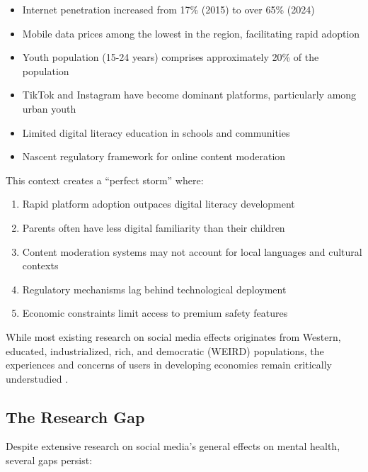 \documentclass[11pt,a4paper]{article}
\begin{document}
\begin{itemize}[itemsep=0.3em]
    \item Internet penetration increased from 17\% (2015) to over 65\% (2024)
    \item Mobile data prices among the lowest in the region, facilitating rapid adoption
    \item Youth population (15-24 years) comprises approximately 20\% of the population
    \item TikTok and Instagram have become dominant platforms, particularly among urban youth
    \item Limited digital literacy education in schools and communities
    \item Nascent regulatory framework for online content moderation
\end{itemize}

This context creates a ``perfect storm'' where:
\begin{enumerate}[itemsep=0.2em]
    \item Rapid platform adoption outpaces digital literacy development
    \item Parents often have less digital familiarity than their children
    \item Content moderation systems may not account for local languages and cultural contexts
    \item Regulatory mechanisms lag behind technological deployment
    \item Economic constraints limit access to premium safety features
\end{enumerate}

While most existing research on social media effects originates from Western, educated, industrialized, rich, and democratic (WEIRD) populations, the experiences and concerns of users in developing economies remain critically understudied \citep{pew2023global}.

\subsection{The Research Gap}

Despite extensive research on social media's general effects on mental health, several gaps persist:
\end{document}
